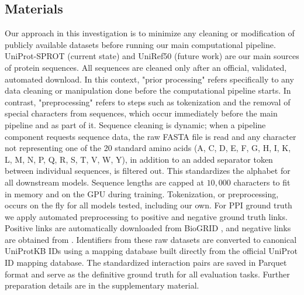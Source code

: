 \documentclass[utf8]{FrontiersinHarvard}
\begin{document}
	\subsection{Materials}
	Our approach in this investigation is to minimize any cleaning or modification of publicly available datasets before running our main computational pipeline. UniProt-SPROT (current state) and UniRef50 (future work) are our main sources of protein sequences. All sequences are cleaned only after an official, validated, automated download. In this context, "prior processing" refers specifically to any data cleaning or manipulation done before the computational pipeline starts. In contrast, "preprocessing" refers to steps such as tokenization and the removal of special characters from sequences, which occur immediately before the main pipeline and as part of it. Sequence cleaning is dynamic; when a pipeline component requests sequence data, the raw FASTA file is read and any character not representing one of the 20 standard amino acids (A, C, D, E, F, G, H, I, K, L, M, N, P, Q, R, S, T, V, W, Y), in addition to an added separator token between individual sequences, is filtered out. This standardizes the alphabet for all downstream models. Sequence lengths are capped at $10,000$ characters to fit in memory and on the GPU during training. Tokenization, or preprocessing, occurs on the fly for all models tested, including our own. For PPI ground truth we apply automated preprocessing to positive and negative ground truth links. Positive links are automatically downloaded from BioGRID \cite{oughtred_biogriddatabasecomprehensive_2021}, and negative links are obtained from \cite{trabuco_negativeproteinprotein_2012}. Identifiers from these raw datasets are converted to canonical UniProtKB IDs using a mapping database built directly from the official UniProt ID mapping database. The standardized interaction pairs are saved in Parquet format and serve as the definitive ground truth for all evaluation tasks. Further preparation details are in the supplementary material.
	
\end{document}
